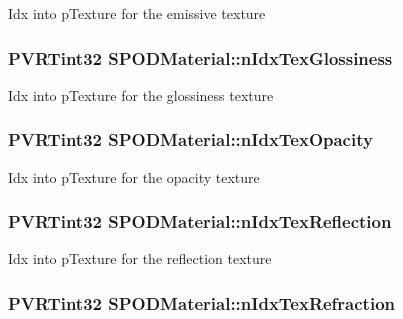 Idx into p\+Texture for the emissive texture \hypertarget{struct_s_p_o_d_material_a0fd374847d4962c3884f7a01585b760e}{
\subsubsection[{n\+Idx\+Tex\+Glossiness}]{\setlength{\rightskip}{0pt plus 5cm}P\+V\+R\+Tint32 S\+P\+O\+D\+Material\+::n\+Idx\+Tex\+Glossiness}}\label{struct_s_p_o_d_material_a0fd374847d4962c3884f7a01585b760e}
Idx into p\+Texture for the glossiness texture \hypertarget{struct_s_p_o_d_material_aaf810502a450c83daf95ba5015c6726e}{
\subsubsection[{n\+Idx\+Tex\+Opacity}]{\setlength{\rightskip}{0pt plus 5cm}P\+V\+R\+Tint32 S\+P\+O\+D\+Material\+::n\+Idx\+Tex\+Opacity}}\label{struct_s_p_o_d_material_aaf810502a450c83daf95ba5015c6726e}
Idx into p\+Texture for the opacity texture \hypertarget{struct_s_p_o_d_material_a01fde1160207ddd7e291a13aba0a6f0a}{
\subsubsection[{n\+Idx\+Tex\+Reflection}]{\setlength{\rightskip}{0pt plus 5cm}P\+V\+R\+Tint32 S\+P\+O\+D\+Material\+::n\+Idx\+Tex\+Reflection}}\label{struct_s_p_o_d_material_a01fde1160207ddd7e291a13aba0a6f0a}
Idx into p\+Texture for the reflection texture \hypertarget{struct_s_p_o_d_material_a692f0d8ae789579331ec8db3afd3b57b}{
\subsubsection[{n\+Idx\+Tex\+Refraction}]{\setlength{\rightskip}{0pt plus 5cm}P\+V\+R\+Tint32 S\+P\+O\+D\+Material\+::n\+Idx\+Tex\+Refraction}}\label{struct_s_p_o_d_material_a692f0d8ae789579331ec8db3afd3b57b}
